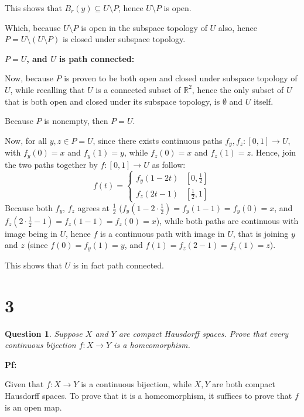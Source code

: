 \documentclass{article}
\newtheorem{question}{Question}
\begin{document}
This shows that $B_r(y)\subseteq U\setminus P$, hence $U\setminus P$ is open.

Which, because $U\setminus P$ is open in the subspace topology of $U$ also, hence $P=U\setminus (U\setminus P)$ is closed under subspace topology.

\hfil

\textbf{$P=U$, and $U$ is path connected:}

Now, because $P$ is proven to be both open and closed under subspace topology of $U$, while recalling that $U$ is a connected subset of $\mathbb{R}^2$,
hence the only subset of $U$ that is both open and closed under its subspace topology, is $\emptyset$ and $U$ itself.

Because $P$ is nonempty, then $P=U$.

Now, for all $y,z\in P=U$, since there exists continuous paths $f_y,f_z:[0,1]\rightarrow U$, with $f_y(0)=x$ and $f_y(1)=y$, while $f_z(0)=x$ and $f_z(1)=z$.
Hence, join the two paths together by $f:[0,1]\rightarrow U$ as follow:
$$f(t)=\begin{cases}
    f_y(1-2t) & [0,\frac{1}{2}]\\
    f_z(2t-1) & [\frac{1}{2},1]
\end{cases}$$
Because both $f_y$, $f_z$ agrees at $\frac{1}{2}$ ($f_y(1-2\cdot\frac{1}{2})=f_y(1-1)=f_y(0)=x$, and $f_z(2\cdot\frac{1}{2}-1)=f_z(1-1)=f_z(0)=x$), while both paths are continuous with image being in $U$,
hence $f$ is a continuous path with image in $U$, that is joining $y$ and $z$ (since $f(0)=f_y(1)=y$, and $f(1)=f_z(2-1)=f_z(1)=z$).

This shows that $U$ is in fact path connected.

\hfil

\hfil

\section*{3}
\begin{myBox}[]{}
    \begin{question}
        Suppose $X$ and $Y$ are compact Hausdorff spaces. Prove that every continuous
        bijection $f:X\rightarrow Y$ is a homeomorphism.
    \end{question}
\end{myBox}

\textbf{Pf:}

Given that $f:X\rightarrow Y$ is a continuous bijection, while $X,Y$ are both compact Hausdorff spaces.
To prove that it is a homeomorphism, it suffices to prove that $f$ is an open map.
\end{document}
